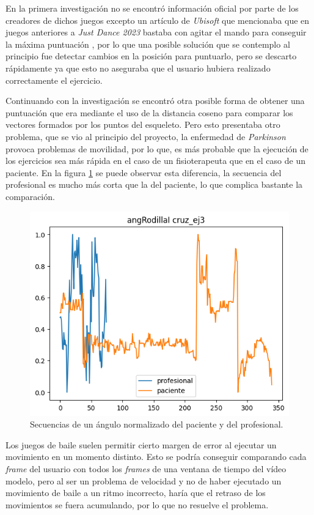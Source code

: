 En la primera investigación no se encontró información oficial por parte de los creadores de dichos juegos excepto un artículo de \textit{Ubisoft} que mencionaba que en juegos anteriores a \textit{Just Dance 2023} bastaba con agitar el mando para conseguir la máxima puntuación \cite{justdance}, por lo que una posible solución que se contemplo al principio fue detectar cambios en la posición para puntuarlo, pero se descarto rápidamente ya que esto no aseguraba que el usuario hubiera realizado correctamente el ejercicio.

Continuando con la investigación se encontró otra posible forma de obtener una puntuación que era mediante el uso de la distancia coseno para comparar los vectores formados por los puntos del esqueleto. Pero esto presentaba otro problema, que se vio al principio del proyecto, la enfermedad de \textit{Parkinson} provoca problemas de movilidad, por lo que, es más probable que la ejecución de los ejercicios sea más rápida en el caso de un fisioterapeuta que en el caso de un paciente. En la figura \ref{fig:longitud} se puede observar esta diferencia, la secuencia del profesional es mucho más corta que la del paciente, lo que complica bastante la comparación.

\begin{figure}
	\centering
	\includegraphics[width=0.8\linewidth]{img/longitud}
	\caption{Secuencias de un ángulo normalizado del paciente y del profesional.}
	\label{fig:longitud}
\end{figure}
 
Los juegos de baile suelen permitir cierto margen de error al ejecutar un movimiento en un momento distinto. Esto se podría conseguir comparando cada \textit{frame} del usuario con todos los \textit{frames} de una ventana de tiempo del vídeo modelo, pero al ser un problema de velocidad y no de haber ejecutado un movimiento de baile a un ritmo incorrecto, haría que el retraso de los movimientos se fuera acumulando, por lo que no resuelve el problema.

